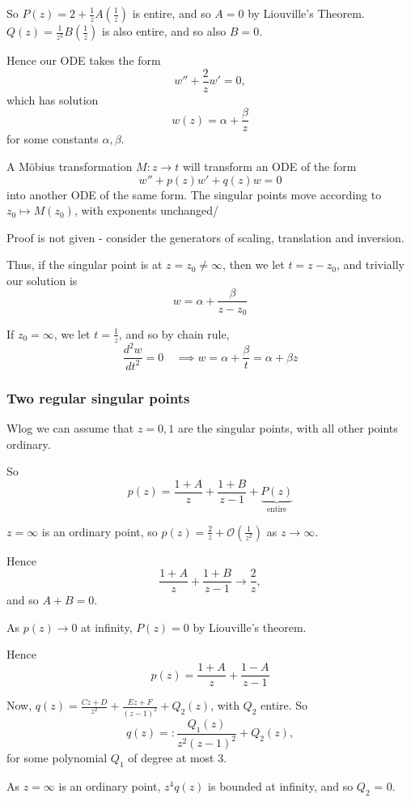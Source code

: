 \documentclass[a4paper]{article}
\begin{document}
So $P(z) = 2 + \frac{1}{z}A\left( \frac{1}{z} \right) $ is entire, and so $A=0$ by Liouville's Theorem. $Q(z) = \frac{1}{z^2}B\left( \frac{1}{z} \right)$ is also entire, and so also $B = 0$.

Hence our ODE takes the form
\[
	w'' + \frac{2}{z} w' = 0
,\] which has solution 
\[
	w(z) = \alpha + \frac{\beta}{z}
\] for some constants $\alpha, \beta$.

\begin{lemma}
	 A M\"{o}bius transformation $M: z\to t$ will transform an ODE of the form
	 \[
		 w'' + p(z) w' + q(z) w = 0
	 \] into another ODE of the same form. The singular points move according to $z_0 \mapsto M(z_0)$, with exponents unchanged/
\end{lemma}

Proof is not given - consider the generators of scaling, translation and inversion.

\vspace{1em}
Thus, if the singular point is at $z=z_0 \neq \infty$, then we let $t = z-z_0$, and trivially our solution is 
\[
w = \alpha + \frac{\beta}{z-z_0}
\] 

If $z_0 = \infty$, we let $t =\frac{1}{z}$, and so by chain rule,
\[
\frac{d^2w}{dt^2} = 0 \quad\implies w = \alpha + \frac{\beta}{t} = \alpha + \beta z
\] 
\subsubsection{Two regular singular points}

Wlog we can assume that $z=0, 1$ are the singular points, with all other points ordinary.

So
\[
	p(z) = \frac{1+A}{z} + \frac{1+B}{z-1}  + \underbrace{P(z)}_{\text{entire}}
\] 

$z=\infty$ is an ordinary point, so $p(z) = \frac{2}{z} + \mathcal{O}\left( \frac{1}{z^2} \right) $ as $z\to \infty$.

Hence  \[
\frac{1+A}{z} + \frac{1+B}{z-1} \to \frac{2}{z}
,\] and so $A+B = 0$.

As  $p(z) \to 0$ at infinity, $P(z) = 0$ by Liouville's theorem.

Hence 
\[
	p(z) = \frac{1+A}{z} + \frac{1-A}{z-1}
\] 


Now, $q(z) = \frac{Cz+D}{z^2} + \frac{Ez + F}{(z-1)^2} + Q_2(z)$, with $Q_2$ entire. So
\[
	q(z) =: \frac{Q_1(z)}{z^2(z-1)^2} + Q_2(z)
,\] for some polynomial $Q_1$ of degree at most $3$.

As $z=\infty$ is an ordinary point, $z^{4}q(z)$ is bounded at infinity, and so $Q_2$ = 0.
\end{document}
